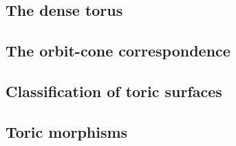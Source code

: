 \subsection{The dense torus}





\subsection{The orbit-cone correspondence}





\subsection{Classification of toric surfaces}





\subsection{Toric morphisms}
